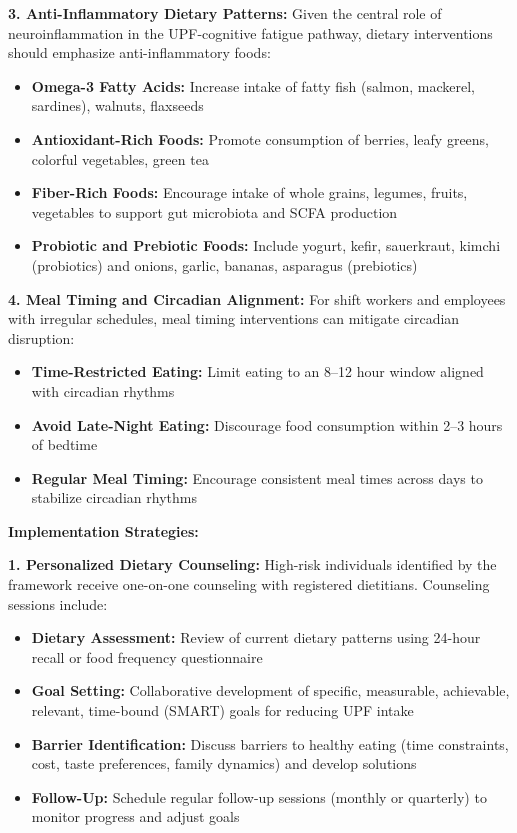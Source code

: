 \documentclass[journal,twoside,10pt]{IEEEtran}
\begin{document}
\textbf{3. Anti-Inflammatory Dietary Patterns:}
Given the central role of neuroinflammation in the UPF-cognitive fatigue pathway, dietary interventions should emphasize anti-inflammatory foods:
\begin{itemize}
\item \textbf{Omega-3 Fatty Acids:} Increase intake of fatty fish (salmon, mackerel, sardines), walnuts, flaxseeds
\item \textbf{Antioxidant-Rich Foods:} Promote consumption of berries, leafy greens, colorful vegetables, green tea
\item \textbf{Fiber-Rich Foods:} Encourage intake of whole grains, legumes, fruits, vegetables to support gut microbiota and SCFA production
\item \textbf{Probiotic and Prebiotic Foods:} Include yogurt, kefir, sauerkraut, kimchi (probiotics) and onions, garlic, bananas, asparagus (prebiotics)
\end{itemize}

\textbf{4. Meal Timing and Circadian Alignment:}
For shift workers and employees with irregular schedules, meal timing interventions can mitigate circadian disruption:
\begin{itemize}
\item \textbf{Time-Restricted Eating:} Limit eating to an 8--12 hour window aligned with circadian rhythms
\item \textbf{Avoid Late-Night Eating:} Discourage food consumption within 2--3 hours of bedtime
\item \textbf{Regular Meal Timing:} Encourage consistent meal times across days to stabilize circadian rhythms
\end{itemize}

\textbf{Implementation Strategies:}

\textbf{1. Personalized Dietary Counseling:}
High-risk individuals identified by the framework receive one-on-one counseling with registered dietitians. Counseling sessions include:
\begin{itemize}
\item \textbf{Dietary Assessment:} Review of current dietary patterns using 24-hour recall or food frequency questionnaire
\item \textbf{Goal Setting:} Collaborative development of specific, measurable, achievable, relevant, time-bound (SMART) goals for reducing UPF intake
\item \textbf{Barrier Identification:} Discuss barriers to healthy eating (time constraints, cost, taste preferences, family dynamics) and develop solutions
\item \textbf{Follow-Up:} Schedule regular follow-up sessions (monthly or quarterly) to monitor progress and adjust goals
\end{itemize}
\end{document}
